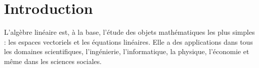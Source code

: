 \chapter{Introduction}
\label{chapter:Fr_introduction}

 
  L'algèbre linéaire est, à la base, l'étude des objets mathématiques les plus simples : les espaces vectoriels et les équations linéaires. Elle a des applications dans tous les domaines scientifiques, l'ingénierie, l'informatique, la physique, l'économie et même dans les sciences sociales.


